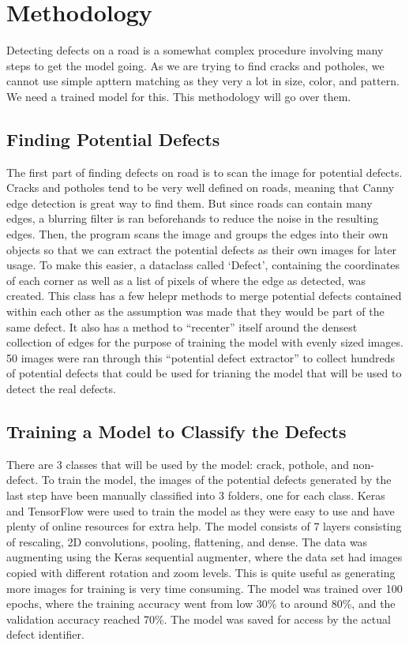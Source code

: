\documentclass[12pt, letterpaper, twoside]{article}
\begin{document}
\section{Methodology}
\label{sec:meth}

Detecting defects on a road is a somewhat complex procedure involving many steps to get the model going. 
As we are trying to find cracks and potholes, we cannot use simple apttern matching as they very a lot in size, color, and pattern.
We need a trained model for this.
This methodology will go over them.

\subsection{Finding Potential Defects}

The first part of finding defects on road is to scan the image for potential defects. 
Cracks and potholes tend to be very well defined on roads, meaning that Canny edge detection is great way to find them.
But since roads can contain many edges, a blurring filter is ran beforehands to reduce the noise in the resulting edges.
Then, the program scans the image and groups the edges into their own objects so that we can extract the potential defects as their own images for later usage.
To make this easier, a dataclass called `Defect', containing the coordinates of each corner as well as a list of pixels of where the edge as detected, was created. 
This class has a few helepr methods to merge potential defects contained within each other as the assumption was made that they would be part of the same defect.
It also has a method to ``recenter'' itself around the densest collection of edges for the purpose of training the model with evenly sized images.
50 images were ran through this ``potential defect extractor'' to collect hundreds of potential defects that could be used for trianing the model that will be used to detect the real defects.

\subsection{Training a Model to Classify the Defects}

There are 3 classes that will be used by the model: crack, pothole, and non-defect. 
To train the model, the images of the potential defects generated by the last step have been manually classified into 3 folders, one for each class.
Keras and TensorFlow were used to train the model as they were easy to use and have plenty of online resources for extra help.
The model consists of 7 layers consisting of rescaling, 2D convolutions, pooling, flattening, and dense.
The data was augmenting using the Keras sequential augmenter, where the data set had images copied with different rotation and zoom levels.
This is quite useful as generating more images for training is very time consuming.
The model was trained over 100 epochs, where the training accuracy went from low 30\% to around 80\%,
and the validation accuracy reached 70\%.
The model was saved for access by the actual defect identifier.
\end{document}
